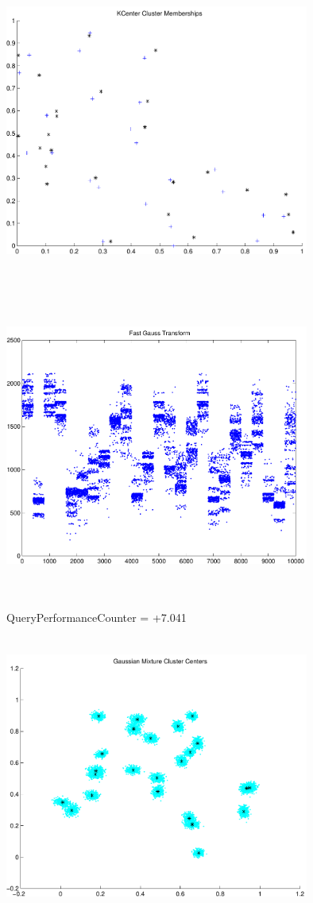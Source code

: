 \documentclass[9pt]{article}
\theoremstyle{plain}
\theoremstyle{definition}
\theoremstyle{remark}
\numberwithin{equation}{section}
\begin{document}
\includegraphics[width=10.0cm,height=10.0cm]{KCenterClusterMemberships_25_Centers.pdf}

\includegraphics[width=10.0cm,height=10.0cm]{FGT25_Centers.pdf}

QueryPerformanceCounter  =  +7.041
\includegraphics[width=10.0cm,height=10.0cm]{GaussianMixture_ClusterCenters24_Centers.pdf}
\end{document}
